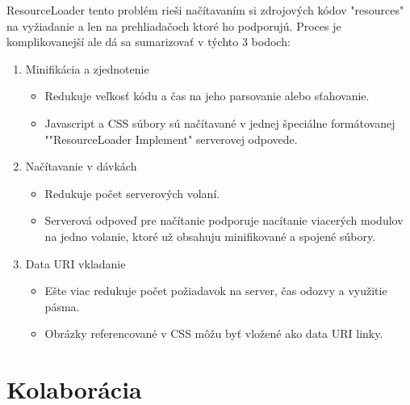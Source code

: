 ResourceLoader tento problém rieši načítavaním si zdrojových kódov "resources" na vyžiadanie a len na prehliadačoch ktoré ho podporujú. Proces je komplikovanejší ale dá sa sumarizovať v týchto 3 bodoch:

\begin{enumerate}
	\item Minifikácia a zjednotenie
	\begin{itemize}
		\item Redukuje veľkosť kódu a čas na jeho parsovanie alebo sťahovanie. 
		\item Javascript a CSS súbory sú načítavané v jednej špeciálne formátovanej ""ResourceLoader Implement" serverovej odpovede.
	\end{itemize}
	\item Načítavanie v dávkách
	\begin{itemize}
		\item Redukuje počet serverových volaní.
		\item Serverová odpoveď pre načítanie podporuje nacítanie viacerých modulov na jedno volanie, ktoré už obsahuju minifikované a spojené súbory.
	\end{itemize}
	\item Data URI vkladanie
	\begin{itemize}
		\item Ešte viac redukuje počet požiadavok na server, čas odozvy a využitie pásma.
		\item Obrázky referencované v CSS môžu byť vložené ako data URI linky.
	\end{itemize}
\end{enumerate}



\section{Kolaborácia}